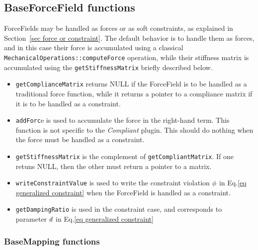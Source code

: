 \subsection{BaseForceField functions}
ForceFields may be handled as forces or as soft constraints, as explained in Section~\ref{sec force or constraint}. 
The default behavior is to handle them as forces, and in this case their force is accumulated using a classical \texttt{MechanicalOperations::computeForce} operation, while their stiffness matrix is accumulated using the \texttt{getStiffnessMatrix} briefly described below.
\begin{itemize}
 \item \texttt{getComplianceMatrix} returns NULL if the ForceField is to be handled as a traditional force function, while it returns a pointer to a compliance matrix if it is to be handled as a constraint.
 \item \texttt{addForc}e is used to accumulate the force in the right-hand term. This function is not specific to the \textit{Compliant} plugin. This should do nothing when the force must be handled as a constraint.
 \item \texttt{getStiffnessMatrix} is the complement of \texttt{getCompliantMatrix}. If one retuns NULL, then the other must return a pointer to a matrix.
 \item \texttt{writeConstraintValue} is used to write the constraint violation $\phi$ in Eq.\ref{eq generalized constraint} when the ForceField is handled as a constraint.
 \item \texttt{getDampingRatio} is used in the constraint case, and corresponds to parameter $ d$ in Eq.\ref{eq generalized constraint}
\end{itemize}

\subsubsection{BaseMapping functions}


